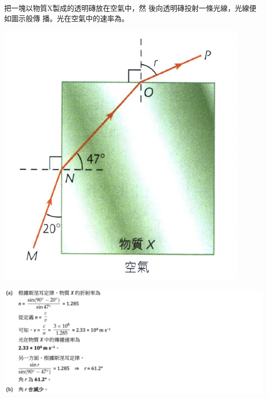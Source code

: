 {
    把一塊以物質X製成的透明磚放在空氣中，然 後向透明磚投射一條光線，光線便如圖示般傳 播。光在空氣中的速率為。
    \par{\par\centering\includegraphics[width=.35\textwidth]{./img/ch2_refraction_lq_2024-05-18-17-12-34.png}\par}

}{
    \par{\par\centering\includegraphics[width=\textwidth]{./img/ch2_refraction_lq_2024-05-18-17-36-34.png}\par}
}

